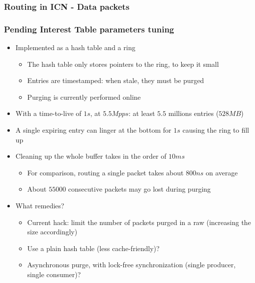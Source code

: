 \begin{frame}[fragile]
  \frametitle{Routing in ICN - Data packets}
  \begin{algorithm}[H]
    \DontPrintSemicolon
    
  \end{algorithm}
\end{frame}

\begin{frame}[fragile]
  \frametitle{Pending Interest Table parameters tuning}

  \begin{itemize}
    \item<+-> Implemented as a hash table and a ring
      \begin{itemize}
        \item The hash table only stores pointers to the ring, to keep it small
        \item Entries are timestamped: when stale, they must be purged
        \item Purging is currently performed online
      \end{itemize}
    \item<+-> With a time-to-live of $1 s$, at $5.5 Mpps$: at least $5.5$ millions entries ($528 MB$)
    \item<+-> A single expiring entry can linger at the bottom for $1 s$ causing the ring to fill up
    \item<+-> Cleaning up the whole buffer takes in the order of $10 ms$
      \begin{itemize}
        \item For comparison, routing a single packet takes about $800 ns$ on average
        \item About $55000$ consecutive packets may go lost during purging
      \end{itemize}
    \item<+-> What remedies?
      \begin{itemize}
        \item Current hack: limit the number of packets purged in a raw (increasing the size accordingly)
        \item Use a plain hash table (less cache-friendly)?
        \item Asynchronous purge, with lock-free synchronization (single producer, single consumer)?
      \end{itemize}
  \end{itemize}
\end{frame}

